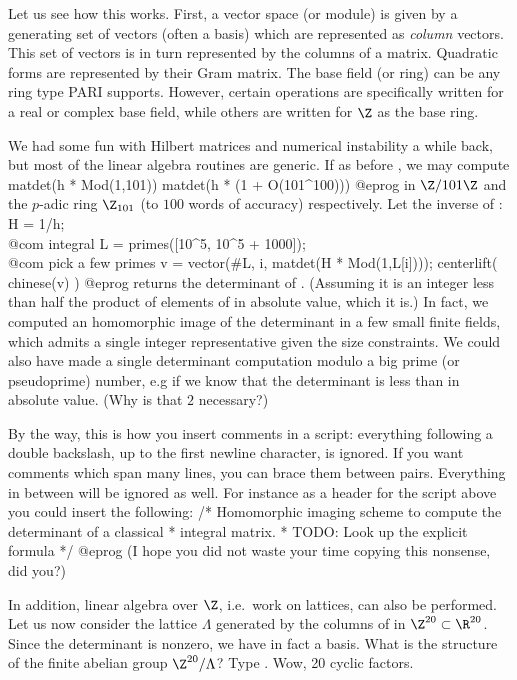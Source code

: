 Let us see how this works. First, a vector space (or module) is given by a
generating set of vectors (often a basis) which are represented as
\emph{column} vectors. This set of vectors is in turn represented by the
columns of a matrix. Quadratic forms are represented by their Gram matrix.
The base field (or ring) can be any ring type PARI supports. However, certain
operations are specifically written for a real or complex base field, while
others are written for $\Z$ as the base ring.

We had some fun with Hilbert matrices and numerical instability a while back,
but most of the linear algebra routines are generic. If as before , we may compute
\bprog
  matdet(h * Mod(1,101))
  matdet(h * (1 + O(101^100)))
@eprog\noindent
in $\Z/101\Z$ and the $p$-adic ring $\Z_{101}$ (to $100$ words of accuracy)
respectively. Let  the inverse of :
\bprog
  H = 1/h;  \\ @com integral
  L = primes([10^5, 10^5 + 1000]);  \\ @com pick a few primes
  v = vector(#L, i, matdet(H * Mod(1,L[i])));
  centerlift( chinese(v) )
@eprog\noindent
returns the determinant of . (Assuming it is an integer
less than half the product of elements of  in absolute value, which
it is.)
In fact, we computed an homomorphic image of the determinant in a few small
finite fields, which admits a single integer representative given the size
constraints. We could also have made a single determinant computation modulo
a big prime (or pseudoprime) number, e.g  if we know
that the determinant is less than  in absolute value.
(Why is that $2$ necessary?)

By the way, this is how you insert comments in a script: everything
following a double backslash, up to the first newline character, is ignored.
If you want comments which span many lines, you can brace them between
 pairs. Everything in between will be ignored as well. For
instance as a header for the script above you could insert the
following:
\bprog
  /* Homomorphic imaging scheme to compute the determinant of a classical
   * integral matrix.
   * TODO: Look up the explicit formula
   */
@eprog\noindent
(I hope you did not waste your time copying this nonsense, did you?)
\medskip

In addition, linear algebra over $\Z$, i.e.~work on lattices, can also be
performed. Let us now consider the lattice $\Lambda$ generated by the columns
of  in $\Z^{20}\subset\R^{20}$. Since the determinant is nonzero, we
have in fact a basis. What is the structure of the finite abelian group
$\Z^{20}/\Lambda$? Type . Wow, 20 cyclic factors.


